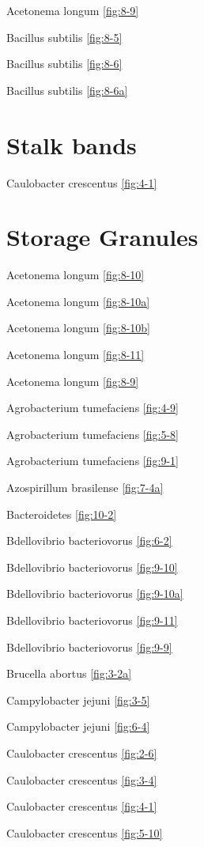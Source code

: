\documentclass[]{tufte-book}
\begin{document}
Acetonema longum \ref{fig:8-9}

Bacillus subtilis \ref{fig:8-5}

Bacillus subtilis \ref{fig:8-6}

Bacillus subtilis \ref{fig:8-6a}

\section{\texorpdfstring{\textbf{Stalk
bands}}{Stalk bands}}\label{stalk-bands}

Caulobacter crescentus \ref{fig:4-1}

\section{\texorpdfstring{\textbf{Storage
Granules}}{Storage Granules}}\label{storage-granules}

Acetonema longum \ref{fig:8-10}

Acetonema longum \ref{fig:8-10a}

Acetonema longum \ref{fig:8-10b}

Acetonema longum \ref{fig:8-11}

Acetonema longum \ref{fig:8-9}

Agrobacterium tumefaciens \ref{fig:4-9}

Agrobacterium tumefaciens \ref{fig:5-8}

Agrobacterium tumefaciens \ref{fig:9-1}

Azospirillum brasilense \ref{fig:7-4a}

Bacteroidetes \ref{fig:10-2}

Bdellovibrio bacteriovorus \ref{fig:6-2}

Bdellovibrio bacteriovorus \ref{fig:9-10}

Bdellovibrio bacteriovorus \ref{fig:9-10a}

Bdellovibrio bacteriovorus \ref{fig:9-11}

Bdellovibrio bacteriovorus \ref{fig:9-9}

Brucella abortus \ref{fig:3-2a}

Campylobacter jejuni \ref{fig:3-5}

Campylobacter jejuni \ref{fig:6-4}

Caulobacter crescentus \ref{fig:2-6}

Caulobacter crescentus \ref{fig:3-4}

Caulobacter crescentus \ref{fig:4-1}

Caulobacter crescentus \ref{fig:5-10}
\end{document}
